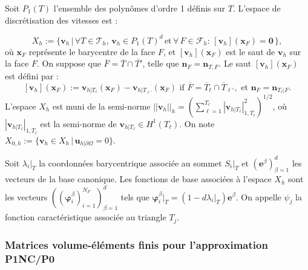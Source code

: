 Soit $P_{1}(T)$ l'ensemble des polyn\^omes d'ordre 1 d\'efinis sur $T$.
L'espace de discr\'etisation des vitesses est :

\begin{equation}
X_{h}:=\{\mathbf{v}_{h}\,|\,\forall T\in\mathcal{T}_{h},\,\mathbf{v}_{h}\in P_{1}(T)^{d}\,\mbox{et}\,\forall\,F\in\mathcal{F}{}_{h}:\,[\mathbf{v}_{h}](\mathbf{x}_{F})=\mathbf{0}\,\},\label{eq:CrRa}
\end{equation}
o\`u $\mathbf{x}_{F}$ repr\'esente le barycentre de la face $F$, et
$[\mathbf{v}_{h}](\mathbf{x}_{F})$ est le saut de $\mathbf{v}_{h}$
sur la face $F$. On suppose que $\overline{F}=\overline{T}\cap\overline{T'}$,
telle que $\mathbf{n}_{F}=\mathbf{n}_{T,F}$. Le saut $[\mathbf{v}_{h}](\mathbf{x}_{F})$
est d\'efini par : 
\[
[\mathbf{v}_{h}](\mathbf{x}_{F}):=\mathbf{v}_{h|T_{\ell}}(\mathbf{x}_{F})-\mathbf{v}_{h|T_{\ell'}}(\mathbf{x}_{F})\mbox{ if }\overline{F}=\overline{T}_{\ell}\cap\overline{T}_{\ell'},\mbox{ et }\mathbf{n}_{F}=\mathbf{n}_{T_{\ell}|F}.
\]
L'espace $X_{h}$ est muni de la semi-norme $||\mathbf{v}_{h}||_{h}=\left(\sum_{\ell=1}^{T_{\ell}}|\mathbf{v}_{h|T_{\ell}}|_{1,T_{\ell}}^{2}\right)^{1/2}$,
o\`u $|\mathbf{v}_{h|T_{\ell}}|_{1,T_{\ell}}$ est la semi-norme de
$\mathbf{v}_{h|T_{\ell}}\in H^{1}(T_{\ell})$. On note $X_{0,h}:=\{\mathbf{v}_{h}\in X_{h}\,|\,\mathbf{u}_{h|\partial\Omega}=0\}$. 

Soit $\lambda_{i}|_{T}$ la coordonn\'ees barycentrique associ\'ee au
sommet $S_{i}|_{T}$ et $\left(\mathbf{e}^{\beta}\right)_{\beta=1}^{d}$
les vecteurs de la base canonique. Les fonctions de base associ\'ees
\`a l'espace $X_{h}$ sont les vecteurs $\left(\left(\boldsymbol{\varphi}_{i}^{\beta}\right)_{i=1}^{N_{F}}\right)_{\beta=1}^{d}$
tels que $\boldsymbol{\varphi}_{i}^{\beta}|_{T}=\left(1-d\lambda_{i}|_{T}\right)\mathbf{e}^{\beta}$.
On appelle $\psi_{j}$ la fonction caract\'eristique associ\'ee au triangle
$T_{j}$.


\subsubsection{Matrices volume-\'el\'ements finis pour l'approximation P1NC/P0}

